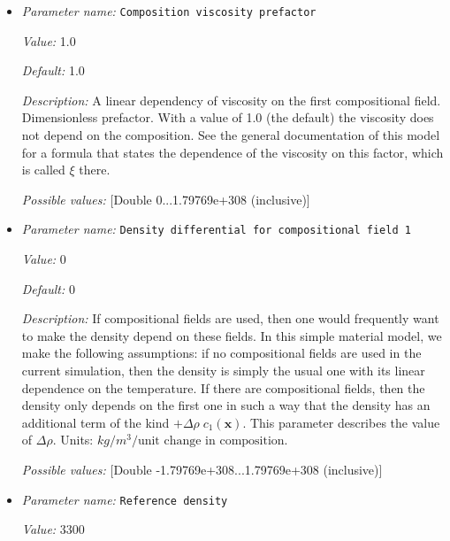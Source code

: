\begin{itemize}
\item {\it Parameter name:} {\tt Composition viscosity prefactor}
\label{parameters:Material model/Simple model/Composition viscosity prefactor}


{\it Value:} 1.0


{\it Default:} 1.0


{\it Description:} A linear dependency of viscosity on the first compositional field. Dimensionless prefactor. With a value of 1.0 (the default) the viscosity does not depend on the composition. See the general documentation of this model for a formula that states the dependence of the viscosity on this factor, which is called $\xi$ there.


{\it Possible values:} [Double 0...1.79769e+308 (inclusive)]
\item {\it Parameter name:} {\tt Density differential for compositional field 1}
\label{parameters:Material model/Simple model/Density differential for compositional field 1}


{\it Value:} 0


{\it Default:} 0


{\it Description:} If compositional fields are used, then one would frequently want to make the density depend on these fields. In this simple material model, we make the following assumptions: if no compositional fields are used in the current simulation, then the density is simply the usual one with its linear dependence on the temperature. If there are compositional fields, then the density only depends on the first one in such a way that the density has an additional term of the kind $+\Delta \rho \; c_1(\mathbf x)$. This parameter describes the value of $\Delta \rho$. Units: $kg/m^3/\textrm{unit change in composition}$.


{\it Possible values:} [Double -1.79769e+308...1.79769e+308 (inclusive)]
\item {\it Parameter name:} {\tt Reference density}
\label{parameters:Material model/Simple model/Reference density}


{\it Value:} 3300



\end{itemize}
